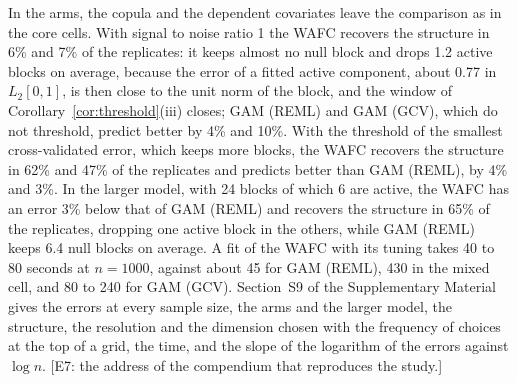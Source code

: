In the arms, the copula and the dependent covariates leave the comparison as
in the core cells. With signal to noise ratio 1 the WAFC recovers the
structure in 6\% and 7\% of the replicates: it keeps almost no null block and
drops 1.2 active blocks on average, because the error of a fitted active
component, about 0.77 in $L_2[0,1]$, is then close to the unit norm of the
block, and the window of Corollary~\ref{cor:threshold}(iii) closes; GAM
(REML) and GAM (GCV), which do not threshold, predict better by 4\% and 10\%.
With the threshold of the smallest cross-validated error, which keeps more
blocks, the WAFC recovers the structure in 62\% and 47\% of the replicates
and predicts better than GAM (REML), by 4\% and 3\%.
In the larger model, with 24 blocks of which 6 are active, the WAFC has an
error 3\% below that of GAM (REML) and recovers the structure in 65\% of the
replicates, dropping one active block in the others, while GAM (REML) keeps
6.4 null blocks on average. A fit of the WAFC with its tuning takes 40 to 80
seconds at $n = 1000$, against about 45 for GAM (REML), 430 in the mixed
cell, and 80 to 240 for GAM (GCV). Section~S9 of the Supplementary Material
gives the errors at every sample size, the arms and the larger model,
the structure, the resolution and the dimension chosen with the frequency of
choices at the top of a grid, the time, and the slope of the logarithm of the
errors against $\log n$. [E7: the address of the compendium that reproduces
the study.]






